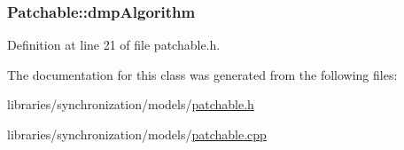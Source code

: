 \hypertarget{class_patchable_a3fd21cfdd40012979695e7aefe76558b}{
\subsubsection[{dmpAlgorithm}]{ {\bf Patchable::dmpAlgorithm}}}
\label{class_patchable_a3fd21cfdd40012979695e7aefe76558b}


Definition at line 21 of file patchable.h.



The documentation for this class was generated from the following files:\begin{DoxyCompactItemize}
\item 
libraries/synchronization/models/\hyperlink{patchable_8h}{patchable.h}\item 
libraries/synchronization/models/\hyperlink{patchable_8cpp}{patchable.cpp}\end{DoxyCompactItemize}
